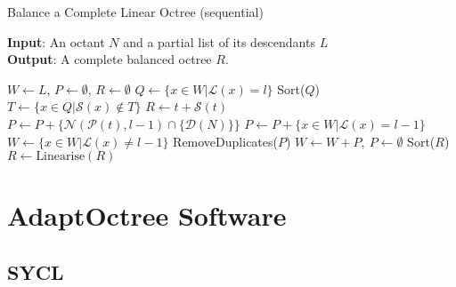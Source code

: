 \documentclass[12pt, a4, twoside]{article}
\begin{document}
\begin{algorithm}
    \caption{Balance a Complete Linear Octree (sequential)}\label{alg:balance}
    \hspace*{\algorithmicindent} \textbf{Input}: An octant $N$ and a partial list of its descendants $L$ \\
    \hspace*{\algorithmicindent} \textbf{Output}: A complete balanced octree $R$.
    \begin{algorithmic}[1]
    \State $W \gets L$, $P \gets \emptyset$, $R \gets \emptyset$
            \State $Q \gets \{x \in W | \mathcal{L}(x)=l\}$
            \State Sort($Q$)
            \State $T \gets \{x \in Q | \mathcal{S}(x) \notin T\}$
               \State $R \gets t + \mathcal{S}(t)$
               \State $P \gets P + \{\mathcal{N}(\mathcal{P}(t), l-1) \cap \{\mathcal{D}(N)\}\}$
            \EndFor
            \State $P \gets P + \{x \in W | \mathcal{L}(x) = l-1\}$
            \State $W \gets \{x \in W | \mathcal{L}(x) \neq l-1\}$
            \State RemoveDuplicates($P$)
            \State $W \gets W + P, \> P \gets \emptyset$
        \EndFor
        \State Sort($R$)
        \State $R \gets \text{Linearise}(R)$ 
    \EndFunction
    \end{algorithmic}
 \end{algorithm}


\section*{AdaptOctree Software}

\subsection*{SYCL}


\newpage
\printbibliography
\end{document}
